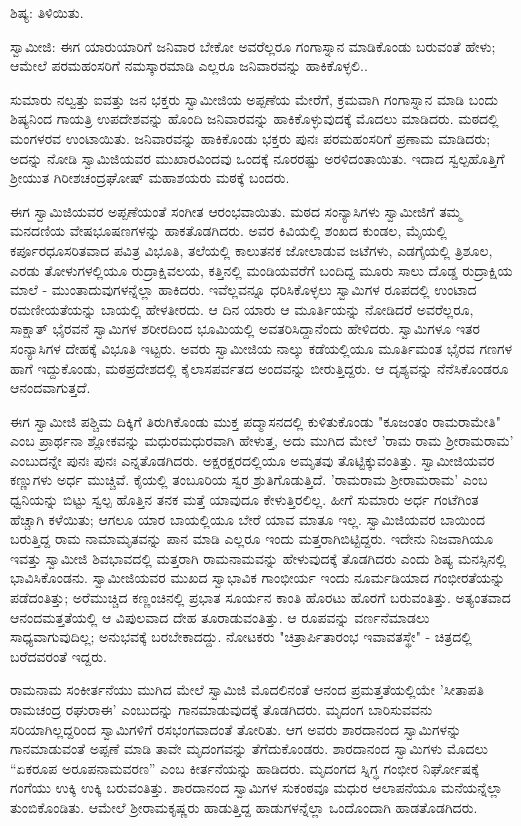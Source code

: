 ಶಿಷ್ಯ: ತಿಳಿಯಿತು.

ಸ್ವಾಮೀಜಿ: ಈಗ ಯಾರುಯಾರಿಗೆ ಜನಿವಾರ ಬೇಕೋ ಅವರೆಲ್ಲರೂ ಗಂಗಾಸ್ನಾನ ಮಾಡಿಕೊಂಡು ಬರುವಂತೆ ಹೇಳು; ಆಮೇಲೆ ಪರಮಹಂಸರಿಗೆ ನಮಸ್ಕಾರಮಾಡಿ ಎಲ್ಲರೂ ಜನಿವಾರವನ್ನು ಹಾಕಿಕೊಳ್ಳಲಿ..

ಸುಮಾರು ನಲ್ವತ್ತು ಐವತ್ತು ಜನ ಭಕ್ತರು ಸ್ವಾಮೀಜಿಯ ಅಪ್ಪಣೆಯ ಮೇರೆಗೆ, ಕ್ರಮವಾಗಿ ಗಂಗಾಸ್ನಾನ ಮಾಡಿ ಬಂದು ಶಿಷ್ಯನಿಂದ ಗಾಯತ್ರಿ ಉಪದೇಶವನ್ನು ಹೊಂದಿ ಜನಿವಾರವನ್ನು ಹಾಕಿಕೊಳ್ಳುವುದಕ್ಕೆ ಮೊದಲು ಮಾಡಿದರು. ಮಠದಲ್ಲಿ ಮಂಗಳರವ ಉಂಟಾಯಿತು. ಜನಿವಾರವನ್ನು ಹಾಕಿಕೊಂಡು ಭಕ್ತರು ಪುನಃ ಪರಮಹಂಸರಿಗೆ ಪ್ರಣಾಮ ಮಾಡಿದರು; ಅದನ್ನು ನೋಡಿ ಸ್ವಾಮಿಜಿಯವರ ಮುಖಾರವಿಂದವು ಒಂದಕ್ಕೆ ನೂರರಷ್ಟು ಅರಳಿದಂತಾಯಿತು. ಇದಾದ ಸ್ವಲ್ಪಹೊತ್ತಿಗೆ ಶ‍್ರೀಯುತ ಗಿರೀಶಚಂದ್ರಘೋಷ್ ಮಹಾಶಯರು ಮಠಕ್ಕೆ ಬಂದರು.

ಈಗ ಸ್ವಾಮಿಜಿಯವರ ಅಪ್ಪಣೆಯಂತೆ ಸಂಗೀತ ಆರಂಭವಾಯಿತು. ಮಠದ ಸಂನ್ಯಾಸಿಗಳು ಸ್ವಾಮೀಜಿಗೆ ತಮ್ಮ ಮನದಣಿಯ ವೇಷಭೂಷಣಗಳನ್ನು ಹಾಕತೊಡಗಿದರು. ಅವರ ಕಿವಿಯಲ್ಲಿ ಶಂಖದ ಕುಂಡಲ, ಮೈಯಲ್ಲಿ ಕರ್ಪೂರಧೂಸರಿತವಾದ ಪವಿತ್ರ ವಿಭೂತಿ, ತಲೆಯಲ್ಲಿ ಕಾಲುತನಕ ಜೋಲಾಡುವ ಜಟೆಗಳು, ಎಡಗೈಯಲ್ಲಿ ತ್ರಿಶೂಲ, ಎರಡು ತೋಳುಗಳಲ್ಲಿಯೂ ರುದ್ರಾಕ್ಷಿವಲಯ, ಕತ್ತಿನಲ್ಲಿ ಮಂಡಿಯವರೆಗೆ ಬಂದಿದ್ದ ಮೂರು ಸಾಲು ದೊಡ್ಡ ರುದ್ರಾಕ್ಷಿಯ ಮಾಲೆ - ಮುಂತಾದುವುಗಳನ್ನೆಲ್ಲಾ ಹಾಕಿದರು. ಇವೆಲ್ಲವನ್ನೂ ಧರಿಸಿಕೊಳ್ಳಲು ಸ್ವಾಮಿಗಳ ರೂಪದಲ್ಲಿ ಉಂಟಾದ ರಮಣೀಯತೆಯನ್ನು ಬಾಯಲ್ಲಿ ಹೇಳತೀರದು. ಆ ದಿನ ಯಾರು ಆ ಮೂರ್ತಿಯನ್ನು ನೋಡಿದರೆ ಅವರೆಲ್ಲರೂ, ಸಾಕ್ಷಾತ್ ಭೈರವನೆ ಸ್ವಾಮಿಗಳ ಶರೀರದಿಂದ ಭೂಮಿಯಲ್ಲಿ ಅವತರಿಸಿದ್ದಾನೆಂದು ಹೇಳಿದರು. ಸ್ವಾಮಿಗಳೂ ಇತರ ಸಂನ್ಯಾಸಿಗಳ ದೇಹಕ್ಕೆ ವಿಭೂತಿ ಇಟ್ಟರು. ಅವರು ಸ್ವಾಮೀಜಿಯ ನಾಲ್ಕು ಕಡೆಯಲ್ಲಿಯೂ ಮೂರ್ತಿಮಂತ ಭೈರವ ಗಣಗಳ ಹಾಗೆ ಇದ್ದುಕೊಂಡು, ಮಠಪ್ರದೇಶದಲ್ಲಿ ಕೈಲಾಸಪರ್ವತದ ಅಂದವನ್ನು ಬೀರುತ್ತಿದ್ದರು. ಆ ದೃಶ್ಯವನ್ನು ನೆನೆಸಿಕೊಂಡರೂ ಆನಂದವಾಗುತ್ತದೆ.

ಈಗ ಸ್ವಾಮೀಜಿ ಪಶ್ಚಿಮ ದಿಕ್ಕಿಗೆ ತಿರುಗಿಕೊಂಡು ಮುಕ್ತ ಪದ್ಮಾಸನದಲ್ಲಿ ಕುಳಿತುಕೊಂಡು "ಕೂಜಂತಂ ರಾಮರಾಮೇತಿ" ಎಂಬ ಪ್ರಾರ್ಥನಾ ಶ್ಲೋಕವನ್ನು ಮಧುರಮಧುರವಾಗಿ ಹೇಳುತ್ತ, ಅದು ಮುಗಿದ ಮೇಲೆ 'ರಾಮ ರಾಮ ಶ‍್ರೀರಾಮರಾಮ' ಎಂಬುದನ್ನೇ ಪುನಃ ಪುನಃ ಎನ್ನತೊಡಗಿದರು. ಅಕ್ಷರಕ್ಷರದಲ್ಲಿಯೂ ಅಮೃತವು ತೊಟ್ಟಿಕ್ಕುವಂತಿತ್ತು. ಸ್ವಾಮೀಜಿಯವರ ಕಣ್ಣುಗಳು ಅರ್ಧ ಮುಚ್ಚಿವೆ. ಕೈಯಲ್ಲಿ ತಂಬೂರಿಯ ಸ್ವರ ಶ್ರುತಿಗೊಡುತ್ತಿದೆ. 'ರಾಮರಾಮ ಶ‍್ರೀರಾಮರಾಮ' ಎಂಬ ಧ್ವನಿಯನ್ನು ಬಿಟ್ಟು ಸ್ವಲ್ಪ ಹೊತ್ತಿನ ತನಕ ಮತ್ತೆ ಯಾವುದೂ ಕೇಳುತ್ತಿರಲಿಲ್ಲ. ಹೀಗೆ ಸುಮಾರು ಅರ್ಧ ಗಂಟೆಗಿಂತ ಹೆಚ್ಚಾಗಿ ಕಳೆಯಿತು; ಆಗಲೂ ಯಾರ ಬಾಯಲ್ಲಿಯೂ ಬೇರೆ ಯಾವ ಮಾತೂ ಇಲ್ಲ. ಸ್ವಾಮಿಜಿಯವರ ಬಾಯಿಂದ ಬರುತ್ತಿದ್ದ ರಾಮ ನಾಮಾಮೃತವನ್ನು ಪಾನ ಮಾಡಿ ಎಲ್ಲರೂ ಇಂದು ಮತ್ತರಾಗಿಬಿಟ್ಟಿದ್ದರು. ಇದೇನು ನಿಜವಾಗಿಯೂ ಇವತ್ತು ಸ್ವಾಮೀಜಿ ಶಿವಭಾವದಲ್ಲಿ ಮತ್ತರಾಗಿ ರಾಮನಾಮವನ್ನು ಹೇಳುವುದಕ್ಕೆ ತೊಡಗಿದರು ಎಂದು ಶಿಷ್ಯ ಮನಸ್ಸಿನಲ್ಲಿ ಭಾವಿಸಿಕೊಂಡನು. ಸ್ವಾಮೀಜಿಯವರ ಮುಖದ ಸ್ವಾಭಾವಿಕ ಗಾಂಭೀರ್ಯ ಇಂದು ನೂರ್ಮಡಿಯಾದ ಗಂಭೀರತೆಯನ್ನು ಪಡೆದಂತಿತ್ತು; ಅರೆಮುಚ್ಚಿದ ಕಣ್ಣಂಚಿನಲ್ಲಿ ಪ್ರಭಾತ ಸೂರ್ಯನ ಕಾಂತಿ ಹೊರಟು ಹೊರಗೆ ಬರುವಂತಿತ್ತು. ಅತ್ಯಂತವಾದ ಆನಂದಮತ್ತತೆಯಲ್ಲಿ ಆ ವಿಪುಲವಾದ ದೇಹ ತೂರಾಡುವಂತಿತ್ತು. ಆ ರೂಪವನ್ನು ವರ್ಣನೆಮಾಡಲು ಸಾಧ್ಯವಾಗುವುದಿಲ್ಲ; ಅನುಭವಕ್ಕೆ ಬರಬೇಕಾದದ್ದು. ನೋಟಕರು "ಚಿತ್ರಾರ್ಪಿತಾರಂಭ ಇವಾವತಸ್ಥೇ" - ಚಿತ್ರದಲ್ಲಿ ಬರೆದವರಂತೆ ಇದ್ದರು.

ರಾಮನಾಮ ಸಂಕೀರ್ತನೆಯು ಮುಗಿದ ಮೇಲೆ ಸ್ವಾಮಿಜಿ ಮೊದಲಿನಂತೆ ಆನಂದ ಪ್ರಮತ್ತತೆಯಲ್ಲಿಯೇ 'ಸೀತಾಪತಿ ರಾಮಚಂದ್ರ ರಘುರಾಈ' ಎಂಬುದನ್ನು ಗಾನಮಾಡುವುದಕ್ಕೆ ತೊಡಗಿದರು. ಮೃದಂಗ ಬಾರಿಸುವವನು ಸರಿಯಾಗಿಲ್ಲದ್ದರಿಂದ ಸ್ವಾಮಿಗಳಿಗೆ ರಸಭಂಗವಾದಂತೆ ತೋರಿತು. ಆಗ ಅವರು ಶಾರದಾನಂದ ಸ್ವಾಮಿಗಳನ್ನು ಗಾನಮಾಡುವಂತೆ ಅಪ್ಪಣೆ ಮಾಡಿ ತಾವೇ ಮೃದಂಗವನ್ನು ತೆಗೆದುಕೊಂಡರು. ಶಾರದಾನಂದ ಸ್ವಾಮಿಗಳು ಮೊದಲು “ಏಕರೂಪ ಅರೂಪನಾಮವರಣ” ಎಂಬ ಕೀರ್ತನೆಯನ್ನು ಹಾಡಿದರು. ಮೃದಂಗದ ಸ್ನಿಗ್ಧ ಗಂಭೀರ ನಿರ್ಘೋಷಕ್ಕೆ ಗಂಗೆಯು ಉಕ್ಕಿ ಉಕ್ಕಿ ಬರುವಂತಿತ್ತು. ಶಾರದಾನಂದ ಸ್ವಾಮಿಗಳ ಸುಕಂಠವೂ ಮಧುರ ಆಲಾಪನೆಯೂ ಮನೆಯನ್ನೆಲ್ಲಾ ತುಂಬಿಕೊಂಡಿತು. ಆಮೇಲೆ ಶ‍್ರೀರಾಮಕೃಷ್ಣರು ಹಾಡುತ್ತಿದ್ದ ಹಾಡುಗಳನ್ನೆಲ್ಲಾ ಒಂದೊಂದಾಗಿ ಹಾಡತೊಡಗಿದರು.

